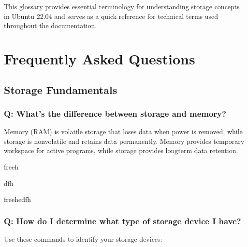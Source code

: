 \documentclass[letterpaper,10pt,english]{sphinxmanual}
\begin{document}
\sphinxAtStartPar
This glossary provides essential terminology for understanding storage concepts in Ubuntu 22.04 and serves as a quick reference for technical terms used throughout the documentation.

\sphinxstepscope


\chapter{Frequently Asked Questions}
\label{\detokenize{faq:frequently-asked-questions}}\label{\detokenize{faq::doc}}

\section{Storage Fundamentals}
\label{\detokenize{faq:storage-fundamentals}}

\subsection{Q: What’s the difference between storage and memory?}
\label{\detokenize{faq:q-what-s-the-difference-between-storage-and-memory}}
\sphinxAtStartPar
{} Memory (RAM) is volatile storage that loses data when power is removed, while storage is non\sphinxhyphen{}volatile and retains data permanently. Memory provides temporary workspace for active programs, while storage provides long\sphinxhyphen{}term data retention.

\begin{sphinxVerbatim}[commandchars=\\\{\}]
free\PYGZhy{}h

df\PYGZhy{}h

free\PYGZhy{}h\PYGZhy{}edf\PYGZhy{}h
\end{sphinxVerbatim}


\subsection{Q: How do I determine what type of storage device I have?}
\label{\detokenize{faq:q-how-do-i-determine-what-type-of-storage-device-i-have}}
\sphinxAtStartPar
{} Use these commands to identify your storage devices:
\end{document}
